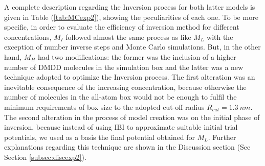\documentclass[10pt,a4paper,twoside]{article}
\begin{document}
  A complete description regarding the Inversion process for both latter models is given in Table (\ref{tab:MCexp2}), showing the peculiarities of each one. To be more specific, in order to evaluate the efficiency of inversion method for different concentrations, $M_{I}$ followed almost the same process as like $M_{L}$ with the exception of number inverse steps and Monte Carlo simulations. But, in the other hand, $M_{H}$ had two modifications: the former was the inclusion of a higher number of DMDD molecules in the simulation box and the latter was a new technique adopted to optimize the Inversion process. The first alteration was an inevitable consequence of the increasing  concentration, because otherwise the number of molecules in the all-atom box would not be enough to fulfil the minimum requirements of box size to the adopted cut-off radius $R_{cut} = 1.3 \ nm$. The second alteration in the process of model creation was on the initial phase of inversion, because instead of using IBI to approximate suitable initial trial potentials, we used as a basis the final potential obtained for $M_{L}$. Further explanations regarding this technique are shown in  the Discussion section (See Section \ref{subsec:discexp2}).
\end{document}
